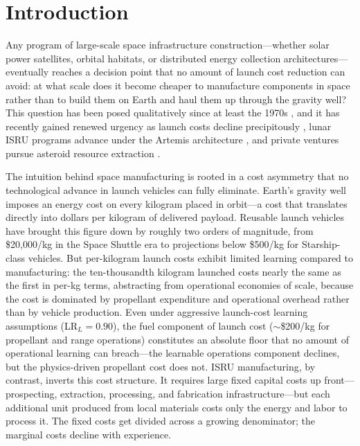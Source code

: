 \documentclass[preprint,12pt]{elsarticle}
\begin{document}
\linenumbers

\section{Introduction}
\label{sec:introduction}

Any program of large-scale space infrastructure construction---whether solar power satellites, orbital habitats, or distributed energy collection architectures---eventually reaches a decision point that no amount of launch cost reduction can avoid: at what scale does it become cheaper to manufacture components in space rather than to build them on Earth and haul them up through the gravity well? This question has been posed qualitatively since at least the 1970s \cite{oneill1974,oneill1976}, and it has recently gained renewed urgency as launch costs decline precipitously \cite{jones2018}, lunar ISRU programs advance under the Artemis architecture \cite{sanders2015}, and private ventures pursue asteroid resource extraction \cite{elvis2012,andrews2015}.

The intuition behind space manufacturing is rooted in a cost asymmetry that no technological advance in launch vehicles can fully eliminate. Earth's gravity well imposes an energy cost on every kilogram placed in orbit---a cost that translates directly into dollars per kilogram of delivered payload. Reusable launch vehicles have brought this figure down by roughly two orders of magnitude, from \$20{,}000/kg in the Space Shuttle era to projections below \$500/kg for Starship-class vehicles. But per-kilogram launch costs exhibit limited learning compared to manufacturing: the ten-thousandth kilogram launched costs nearly the same as the first in per-kg terms, abstracting from operational economies of scale, because the cost is dominated by propellant expenditure and operational overhead rather than by vehicle production. Even under aggressive launch-cost learning assumptions (LR$_L = 0.90$), the fuel component of launch cost ($\sim$\$200/kg for propellant and range operations) constitutes an absolute floor that no amount of operational learning can breach---the learnable operations component declines, but the physics-driven propellant cost does not. ISRU manufacturing, by contrast, inverts this cost structure. It requires large fixed capital costs up front---prospecting, extraction, processing, and fabrication infrastructure---but each additional unit produced from local materials costs only the energy and labor to process it. The fixed costs get divided across a growing denominator; the marginal costs decline with experience.
\end{document}
